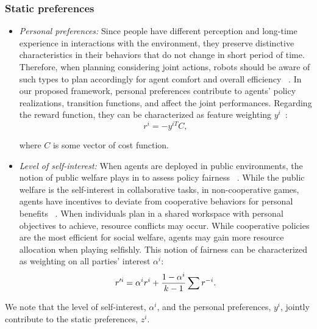 \documentclass[letterpaper, 10 pt, conference]{ieeeconf}  %
\begin{document}
\subsubsection{Static preferences}

\begin{itemize}
	\item \textit{Personal preferences:} Since people have different perception and long-time experience in interactions with the environment, they preserve distinctive characteristics in their behaviors that do not change in short period of time. Therefore, when planning considering joint actions, robots should be aware of such types to plan accordingly for agent comfort and overall efficiency ~\cite{gombolay2015coordination}. In our proposed framework, personal preferences contribute to agents' policy realizations, transition functions, and affect the joint performances. Regarding the reward function, they can be characterized as feature weighting $y^i$~\cite{dorsa2017active}:
	\begin{equation}
	r^i = -y^{iT}C, 
	\end{equation}
	
	where $C$ is some vector of cost function.
	\item \textit{Level of self-interest:} When agents are deployed in public environments, the notion of public welfare plays in to assess policy fairness ~\cite{fehr2004social}. While the public welfare is the self-interest in collaborative tasks, in non-cooperative games, agents have incentives to deviate from cooperative behaviors for personal benefits ~\cite{fujiwara2015non}. When individuals plan in a shared workspace with personal objectives to achieve, resource conflicts may occur. 
	While cooperative policies are the most efficient for social welfare, agents may gain more resource allocation when playing selfishly. This notion of fairness can be characterized as weighting on all parties' interest $\alpha^i$:
	\begin{equation}
	r'^{i} = \alpha^ir^i+ \small{\frac{1-\alpha^i}{k-1}}\sum r^{-i}.
	\end{equation}
	
\end{itemize}

We note that the level of self-interest, $\alpha^i$, and the personal preferences, $y^i$, jointly contribute to the static preferences, $z^i$.
\end{document}
